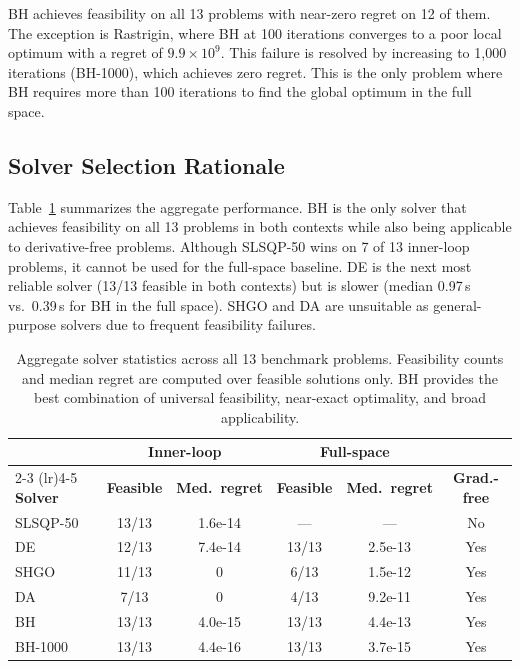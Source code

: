 \documentclass[12pt,a4paper]{article}%
\theoremstyle{plain}%
\theoremstyle{remark}%
\theoremstyle{definition}%
\begin{document}
\begin{appendices}
BH achieves feasibility on all 13 problems with near-zero regret on 12 of them. The exception is Rastrigin, where BH at 100 iterations converges to a poor local optimum with a regret of $9.9 \times 10^9$. This failure is resolved by increasing to 1{,}000 iterations (BH-1000), which achieves zero regret. This is the only problem where BH requires more than 100 iterations to find the global optimum in the full space.

\subsection{Solver Selection Rationale}\label{subsec:solver_rationale}

Table~\ref{tab:solver_summary} summarizes the aggregate performance. BH is the only solver that achieves feasibility on all 13 problems in both contexts while also being applicable to derivative-free problems. Although SLSQP-50 wins on 7 of 13 inner-loop problems, it cannot be used for the full-space baseline. DE is the next most reliable solver (13/13 feasible in both contexts) but is slower (median 0.97\,s vs.\ 0.39\,s for BH in the full space). SHGO and DA are unsuitable as general-purpose solvers due to frequent feasibility failures.

\begin{table}[htbp]
\centering
\caption{Aggregate solver statistics across all 13 benchmark problems. Feasibility counts and median regret are computed over feasible solutions only. BH provides the best combination of universal feasibility, near-exact optimality, and broad applicability.}
\label{tab:solver_summary}
\footnotesize
\begin{tabular}{@{}lccccc@{}}
\toprule
& \multicolumn{2}{c}{\textbf{Inner-loop}} & \multicolumn{2}{c}{\textbf{Full-space}} & \\
\cmidrule(lr){2-3} \cmidrule(lr){4-5}
\textbf{Solver} & \textbf{Feasible} & \textbf{Med.\ regret} & \textbf{Feasible} & \textbf{Med.\ regret} & \textbf{Grad.-free} \\
\midrule
SLSQP-50 & 13/13 & 1.6e-14 & --- & --- & No \\
DE & 12/13 & 7.4e-14 & 13/13 & 2.5e-13 & Yes \\
SHGO & 11/13 & 0 & 6/13 & 1.5e-12 & Yes \\
DA & 7/13 & 0 & 4/13 & 9.2e-11 & Yes \\
BH & 13/13 & 4.0e-15 & 13/13 & 4.4e-13 & Yes \\
BH-1000 & 13/13 & 4.4e-16 & 13/13 & 3.7e-15 & Yes \\
\bottomrule
\end{tabular}
\end{table}


\end{appendices}
\end{document}
